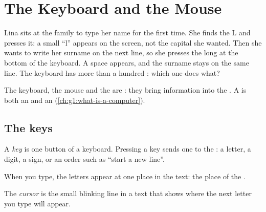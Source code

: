 \chapter{The Keyboard and the Mouse}\label{ch:g2:keyboard-and-mouse}

Lina sits at the family  to type her name for the first time. She
finds the L and presses it: a small ``l'' appears on the screen, not the
capital she wanted. Then she wants to write her surname on the next line, so
she presses the long  at the bottom of the keyboard. A space appears, and
the surname stays on the same line. The keyboard has more than a hundred :
which one does what?

\begin{recall}
The keyboard, the mouse and the  are : they bring
information into the . A  is both an  and an
 (\cref{ch:g1:what-is-a-computer}).
\end{recall}

\section{The keys}

\begin{definition}\label{def:g2:keyboard-and-mouse:key}
A \emph{key} is one button of a keyboard. Pressing a
key sends one  to the : a letter, a digit, a sign, or an order
such as ``start a new line''.
\end{definition}

When you type, the letters appear at one place in the text: the place of the
.

\begin{definition}[Cursor]\label{def:g2:keyboard-and-mouse:cursor}
The \emph{cursor} is the small blinking line in a text that
shows where the next letter you type will appear.
\end{definition}

